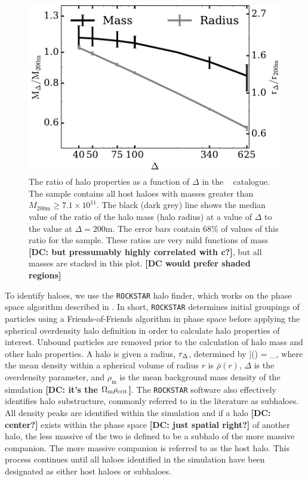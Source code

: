 \documentclass[usenatbib,fleqn]{mnras}
\begin{document}
\begin{figure}
\centering
\includegraphics[width=\columnwidth]{massvsdelta_l0250.pdf}
\caption{
The ratio of halo properties as a function of $\Delta$ in the \simB~ catalogue. The sample contains all host haloes with masses greater than $M_{200\mathrm{m}} \ge 7.1 \times 10^{11}$. The black (dark grey) line shows the median value of the ratio of the halo mass (halo radius) at a value of $\Delta$ to the value at $\Delta=200\mathrm{m}$. The error bars contain 68\% of values of this ratio for the sample. These ratios are 
very mild functions of mass {\bf [DC: but pressumably highly correlated with c?]}, but all masses are stacked in this plot. {\bf [DC would prefer shaded regions]}}
\label{fig:deltacompare}
\end{figure}

To identify haloes, we use the {\tt ROCKSTAR} halo finder, which works on the phase space algorithm described in \citet*{behroozi_etal13a}. In short, {\tt ROCKSTAR} determines initial groupings of particles using a Friends-of-Friends algorithm in phase space before applying the spherical overdensity halo definition in order to calculate halo properties of interest. Unbound particles are removed prior to the calculation of halo mass and other halo properties. A halo is given a radius, $r_{\Delta}$, determined by
\beq
	\bar{\rho}(\Rdel) = \Delta \rho_{}, 
\eeq
where the mean density within a spherical volume of radius $r$ is $\bar{\rho}(r)$, $\Delta$ is the overdensity parameter, and $\rho_{\mathrm{m}}$ is the mean background mass density of the simulation {\bf [DC: it's the $\Omega_{\rm m}\rho_{\rm crit}$]}. The {\tt ROCKSTAR} software also effectively identifies halo substructure, commonly referred to in the literature as subhaloes. All density peaks are identified within the simulation and if a halo {\bf [DC: center?]} exists within the phase space {\bf [DC: just spatial right?]} of another halo, the less massive of the two is defined to be a subhalo of the more massive companion. The more massive companion is referred to as the host halo. This process continues until all haloes identified in the simulation have been designated as either host haloes or subhaloes.
\end{document}
